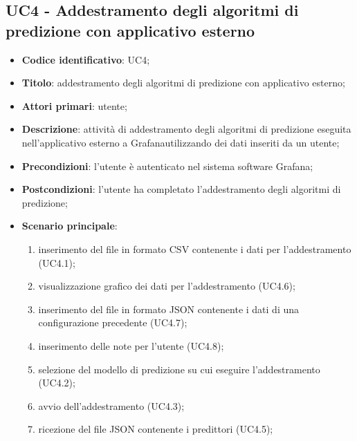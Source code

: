 \subsection{UC4 - Addestramento degli algoritmi di predizione con applicativo esterno}
\begin{itemize}
    \item \textbf{Codice identificativo}: UC4;
    \item \textbf{Titolo}: addestramento degli algoritmi di predizione con applicativo esterno;
    \item \textbf{Attori primari}: utente;
    \item \textbf{Descrizione}: attività di addestramento degli algoritmi di predizione eseguita nell'applicativo esterno a Grafana\glosp utilizzando dei dati inseriti da un utente;
    \item \textbf{Precondizioni}: l'utente è autenticato nel sistema software Grafana\glo;
    \item \textbf{Postcondizioni}: l'utente ha completato l'addestramento degli algoritmi di predizione;
    \item \textbf{Scenario principale}: 
        \begin{enumerate}
            \item inserimento del file in formato CSV contenente i dati per l'addestramento (UC4.1);
            \item visualizzazione grafico dei dati per l'addestramento (UC4.6);
            \item inserimento del file in formato JSON contenente i dati di una configurazione precedente (UC4.7);
            \item inserimento delle note per l'utente (UC4.8);
            \item selezione del modello di predizione su cui eseguire l'addestramento (UC4.2);
            \item avvio dell'addestramento (UC4.3);
            \item ricezione del file JSON contenente i predittori (UC4.5);

\end{enumerate}
\end{itemize}
